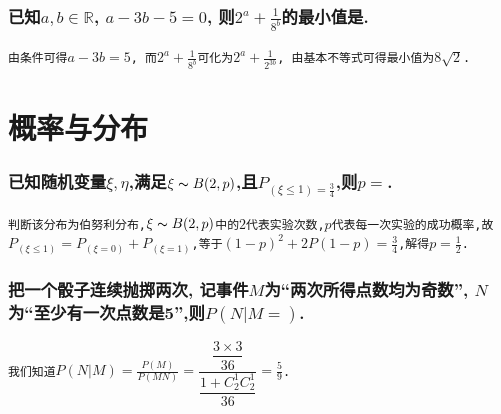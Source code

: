 \documentclass{article}
\newcommand{\1}{\underline{\makebox[1cm]{}}}
\newcommand{\2}{\underline{\makebox[2cm]{}}}
\newcommand{\3}{\underline{\makebox[3cm]{}}}
\newcommand{\4}{\underline{\makebox[4cm]{}}}
\newcommand{\lge}{\large \texttt}
\newlength{\la}
\begin{document}
\section{已知$a, b \in \mathbb{R}$, $a - 3b - 5 = 0$, 则$2^a + \frac{1}{8^b}$的最小值是\2.}
\lge{由条件可得$a - 3b = 5$, 而$2^a + \frac{1}{8^b}$可化为$2^a + \frac{1}{2^{3b}}$, 由基本不等式可得最小值为$8\sqrt{2}$.}


\newpage

\part{概率与分布}

\section{已知随机变量$\xi, \eta $,满足$\xi \thicksim B(2, p)$,且$P_{(\xi \leq 1) = \frac{3}{4}}$,则$p = $\2.}
\lge{判断该分布为伯努利分布,$\xi \thicksim B(2, p)$中的$2$代表实验次数,$p$代表每一次实验的成功概率,故$P_{(\xi \leq 1)} = P_{(\xi = 0)} + P_{(\xi = 1)}$,等于$(1 - p)^2 + 2P(1 - p) = \frac{3}{4}$,解得$p = \frac{1}{2}$.}

\section{把一个骰子连续抛掷两次, 记事件$M$为``两次所得点数均为奇数'', $N$为``至少有一次点数是5'',则$P(N | M = )$\2.}
\lge{我们知道$P(N|M) = \frac{P(M)}{P(MN)} = \dfrac{\dfrac{3 \times 3}{36}}{\dfrac{1 + C_2^1C_2^1}{36}} = \frac{5}{9}$.}
\end{document}
